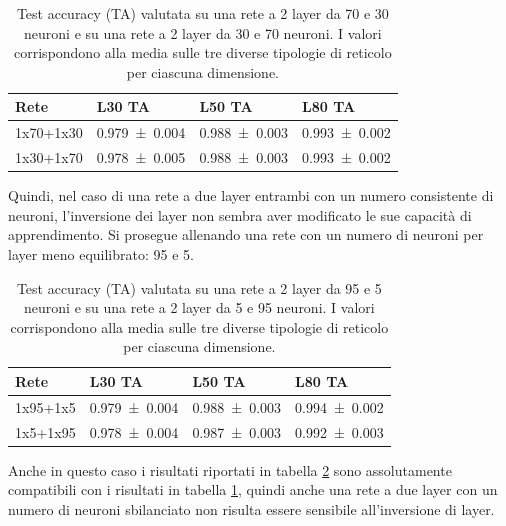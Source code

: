 \documentclass{article}
\begin{document}
\begin{table}[ht]
\begin{center}
\begin{tabular}{llll}
\toprule
Rete & L30 TA & L50 TA & L80 TA\\
\midrule
1x70+1x30 & \num{0.979 \pm 0.004} & \num{0.988 \pm 0.003} & \num{0.993 \pm 0.002} \\
1x30+1x70 & \num{0.978 \pm 0.005} & \num{0.988 \pm 0.003} & \num{0.993 \pm 0.002} \\
\bottomrule
\end{tabular}
\end{center}
\caption{Test accuracy (TA) valutata su una rete a 2 layer da 70 e 30 neuroni e su una rete a 2 layer da 30 e 70 neuroni. I valori corrispondono alla media sulle tre diverse tipologie di reticolo per ciascuna dimensione.}
\label{tab:2LN30-70}
\end{table}

Quindi, nel caso di una rete a due layer entrambi con un numero consistente di neuroni, l'inversione dei layer non sembra aver modificato le sue capacità di apprendimento.
Si prosegue allenando una rete con un numero di neuroni per layer meno equilibrato: 95 e 5.

\begin{table}[ht]
\begin{center}
\begin{tabular}{llll}
\toprule
Rete & L30 TA & L50 TA & L80 TA \\
\midrule
1x95+1x5 & \num{0.979 \pm 0.004} & \num{0.988 \pm 0.003} & \num{0.994 \pm 0.002} \\
1x5+1x95 & \num{0.978 \pm 0.004} & \num{0.987 \pm 0.003} & \num{0.992 \pm 0.003} \\
\bottomrule
\end{tabular}
\end{center}
\caption{Test accuracy (TA) valutata su una rete a 2 layer da 95 e 5 neuroni e su una rete a 2 layer da 5 e 95 neuroni. I valori corrispondono alla media sulle tre diverse tipologie di reticolo per ciascuna dimensione.}
\label{tab:2LN5-95}
\end{table}

Anche in questo caso i risultati riportati in tabella \ref{tab:2LN5-95} sono assolutamente compatibili con i risultati in tabella \ref{tab:2LN30-70}, quindi anche una rete a due layer con un numero di neuroni sbilanciato non risulta essere sensibile all'inversione di layer.
\end{document}
